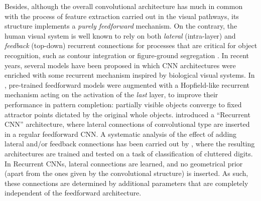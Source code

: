 \documentclass[11pt,oneside,reqno]{amsart}
\begin{document}
  Besides, although the overall convolutional architecture has much in common with the process of feature extraction carried out in the visual pathways, its structure implements a \emph{purely feedforward} mechanism. On the contrary, the human visual system is well known to rely on both \emph{lateral} (intra-layer) and \emph{feedback} (top-down) recurrent connections for processes that are critical for object recognition, such as contour integration or figure-ground segregation \citep{gilbert,gromin,neumin,layton}. In recent years, several models have been proposed in which CNN architectures were enriched with some recurrent mechanism inspired by biological visual systems. In \citet{tang}, pre-trained feedforward models were augmented with a Hopfield-like recurrent mechanism acting on the activation of the \emph{last} layer, to improve their performance in pattern completion: partially visible objects converge to fixed attractor points dictated by the original whole objects. \citet{liang} introduced a ``Recurrent CNN'' architecture, where lateral connections of convolutional type are inserted in a regular feedforward CNN. A systematic analysis of the effect of adding lateral and/or feedback connections has been carried out by \citet{spoerer}, where the resulting architectures are trained and tested on a task of classification of cluttered digits. In Recurrent CNNs, lateral connections are learned, and no geometrical prior (apart from the ones given by the convolutional structure) is inserted. As such, these connections are determined by additional parameters that are completely independent of the feedforward architecture.\\
  
\end{document}
